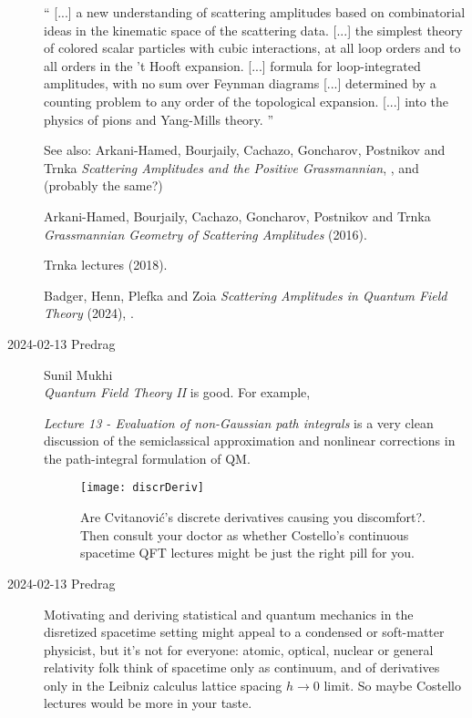 \begin{description}
``
[...] a new understanding of scattering amplitudes based on
combinatorial ideas in the kinematic space of the scattering data.
[...] the simplest theory of colored scalar
particles with cubic interactions, at all loop orders and to all orders
in the 't Hooft expansion. [...] formula for
loop-integrated amplitudes, with no sum over
Feynman diagrams [...] determined by a counting
problem to any order of the topological expansion.
[...]  into the physics of pions and Yang-Mills theory.
''

See also:
Arkani-Hamed, Bourjaily, Cachazo, Goncharov, Postnikov and
Trnka %
  {\em Scattering Amplitudes and the Positive Grassmannian},
  ,
and (probably the same?)

Arkani-Hamed, Bourjaily, Cachazo, Goncharov, Postnikov and
Trnka
  {\em Grassmannian Geometry of Scattering Amplitudes} (2016).

Trnka 
{lectures} (2018).

Badger, Henn, Plefka and Zoia
{\em Scattering Amplitudes in Quantum Field Theory} (2024),
.


\item[2024-02-13 Predrag]  Sunil Mukhi\\
{\em Quantum Field Theory II} is good. For example,

{\em Lecture 13 - Evaluation of non-Gaussian path integrals}
is a very clean discussion of the semiclassical approximation and nonlinear
corrections in the path-integral formulation of QM.

\newpage
%
\begin{figure}
\begin{center}
\texttt{[image: discrDeriv]}
\end{center}
\caption{\label{f:discrDeriv}
Are Cvitanovi{\'c}'s discrete derivatives causing you discomfort?.
Then consult your doctor as whether
Costello's continuous spacetime QFT lectures might be just the right
pill for you.
}
 \end{figure}



\item[2024-02-13 Predrag]
Motivating and deriving statistical and quantum mechanics in the
disretized spacetime setting might appeal to a condensed or soft-matter
physicist, but it's not for everyone: atomic, optical, nuclear or general
relativity folk think of spacetime only as continuum, and of derivatives
only in the Leibniz calculus lattice spacing $h\to0$ limit. So maybe
Costello lectures would be more in your taste.


\end{description}
